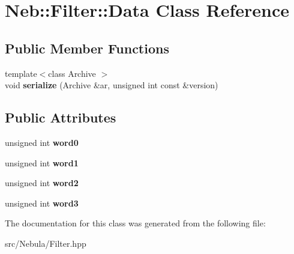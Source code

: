 \hypertarget{classNeb_1_1Filter_1_1Data}{\section{\-Neb\-:\-:\-Filter\-:\-:\-Data \-Class \-Reference}
\label{classNeb_1_1Filter_1_1Data}
}
\subsection*{\-Public \-Member \-Functions}
\begin{DoxyCompactItemize}
\item 
\hypertarget{classNeb_1_1Filter_1_1Data_a727a2c1fa8011f050ada6e871230b585}{{\footnotesize template$<$class Archive $>$ }\\void {\bfseries serialize} (\-Archive \&ar, unsigned int const \&version)}\label{classNeb_1_1Filter_1_1Data_a727a2c1fa8011f050ada6e871230b585}

\end{DoxyCompactItemize}
\subsection*{\-Public \-Attributes}
\begin{DoxyCompactItemize}
\item 
\hypertarget{classNeb_1_1Filter_1_1Data_a4c58a7b73274baec2618f3aaa658737e}{unsigned int {\bfseries word0}}\label{classNeb_1_1Filter_1_1Data_a4c58a7b73274baec2618f3aaa658737e}

\item 
\hypertarget{classNeb_1_1Filter_1_1Data_a53392967cf835071bf2bb34fa96dcf1c}{unsigned int {\bfseries word1}}\label{classNeb_1_1Filter_1_1Data_a53392967cf835071bf2bb34fa96dcf1c}

\item 
\hypertarget{classNeb_1_1Filter_1_1Data_a32ac663d2a72a3c1f3e97dd329c0db5c}{unsigned int {\bfseries word2}}\label{classNeb_1_1Filter_1_1Data_a32ac663d2a72a3c1f3e97dd329c0db5c}

\item 
\hypertarget{classNeb_1_1Filter_1_1Data_a5e0caefa84858430a4456fcd381cb537}{unsigned int {\bfseries word3}}\label{classNeb_1_1Filter_1_1Data_a5e0caefa84858430a4456fcd381cb537}

\end{DoxyCompactItemize}


\-The documentation for this class was generated from the following file\-:\begin{DoxyCompactItemize}
\item 
src/\-Nebula/\-Filter.\-hpp\end{DoxyCompactItemize}
